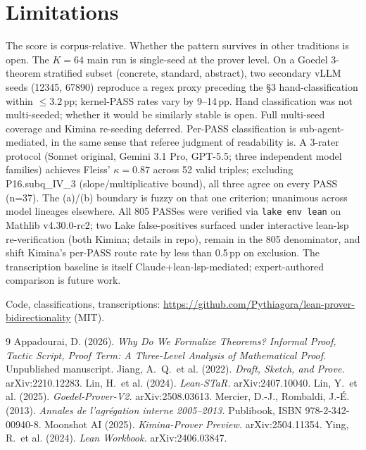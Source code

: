 \documentclass{easychair}
\begin{document}
\section{Limitations}

The score is corpus-relative. Whether the pattern survives in other traditions is open. The $K{=}64$ main run is single-seed at the prover level. On a Goedel 3-theorem stratified subset (concrete, standard, abstract), two secondary vLLM seeds (12345, 67890) reproduce a regex proxy preceding the \S3 hand-classification within $\leq 3.2$\,pp; kernel-PASS rates vary by 9--14\,pp. Hand classification was not multi-seeded; whether it would be similarly stable is open. Full multi-seed coverage and Kimina re-seeding deferred. Per-PASS classification is sub-agent-mediated, in the same sense that referee judgment of readability is. A 3-rater protocol (Sonnet original, Gemini 3.1 Pro, GPT-5.5; three independent model families) achieves Fleiss' $\kappa = 0.87$ across 52 valid triples; excluding P16.subq\_IV\_3 (slope/multiplicative bound), all three agree on every PASS (n=37). The (a)/(b) boundary is fuzzy on that one criterion; unanimous across model lineages elsewhere. All 805 PASSes were verified via \texttt{lake env lean} on Mathlib v4.30.0-rc2; two Lake false-positives surfaced under interactive lean-lsp re-verification (both Kimina; details in repo), remain in the 805 denominator, and shift Kimina's per-PASS route rate by less than 0.5\,pp on exclusion. The transcription baseline is itself Claude+lean-lsp-mediated; expert-authored comparison is future work.

\smallskip
Code, classifications, transcriptions: \url{https://github.com/Pythiagora/lean-prover-bidirectionality} (MIT).

\begin{thebibliography}{9}
 Appadourai, D. (2026). \emph{Why Do We Formalize Theorems? Informal Proof, Tactic Script, Proof Term: A Three-Level Analysis of Mathematical Proof.} Unpublished manuscript.
 Jiang, A.\ Q.\ et al. (2022). \emph{Draft, Sketch, and Prove.} arXiv:2210.12283.
 Lin, H.\ et al. (2024). \emph{Lean-STaR.} arXiv:2407.10040.
 Lin, Y.\ et al. (2025). \emph{Goedel-Prover-V2.} arXiv:2508.03613.
 Mercier, D.-J., Rombaldi, J.-\'E. (2013). \emph{Annales de l'agr\'egation interne 2005--2013.} Publibook, ISBN 978-2-342-00940-8.
 Moonshot AI (2025). \emph{Kimina-Prover Preview.} arXiv:2504.11354.
 Ying, R.\ et al. (2024). \emph{Lean Workbook.} arXiv:2406.03847.
\end{thebibliography}
\end{document}
